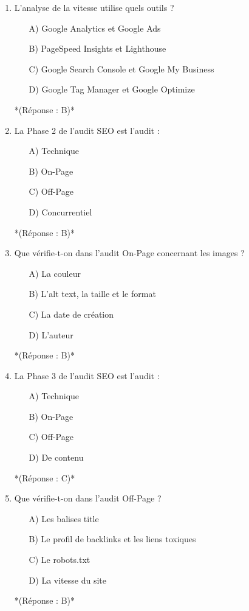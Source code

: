 \documentclass[12pt,a4paper,twoside]{report}
\begin{document}
\begin{enumerate}
    \item L'analyse de la vitesse utilise quels outils ?
    \begin{itemize}
        \item[A)] Google Analytics et Google Ads
        \item[B)] PageSpeed Insights et Lighthouse
        \item[C)] Google Search Console et Google My Business
        \item[D)] Google Tag Manager et Google Optimize
    \end{itemize}
    *(Réponse : B)*

    \item La Phase 2 de l'audit SEO est l'audit :
    \begin{itemize}
        \item[A)] Technique
        \item[B)] On-Page
        \item[C)] Off-Page
        \item[D)] Concurrentiel
    \end{itemize}
    *(Réponse : B)*

    \item Que vérifie-t-on dans l'audit On-Page concernant les images ?
    \begin{itemize}
        \item[A)] La couleur
        \item[B)] L'alt text, la taille et le format
        \item[C)] La date de création
        \item[D)] L'auteur
    \end{itemize}
    *(Réponse : B)*

    \item La Phase 3 de l'audit SEO est l'audit :
    \begin{itemize}
        \item[A)] Technique
        \item[B)] On-Page
        \item[C)] Off-Page
        \item[D)] De contenu
    \end{itemize}
    *(Réponse : C)*

    \item Que vérifie-t-on dans l'audit Off-Page ?
    \begin{itemize}
        \item[A)] Les balises title
        \item[B)] Le profil de backlinks et les liens toxiques
        \item[C)] Le robots.txt
        \item[D)] La vitesse du site
    \end{itemize}
    *(Réponse : B)*


\end{enumerate}
\end{document}

